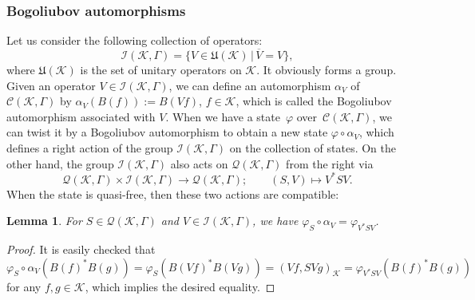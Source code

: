 \documentclass[pdftex]{sigma}
\numberwithin{equation}{section}
\newtheorem{Lemma}[Theorem]{Lemma}
\newcommand{\mfrak}[1]{\mathfrak{#1}}
\newcommand{\mcal}[1]{\mathcal{#1}}
\begin{document}
\subsubsection{Bogoliubov automorphisms}
Let us consider the following collection of operators:
\begin{equation*}
	\mcal{I}(\mcal{K},\Gamma)=\big\{V\in \mfrak{U}(\mcal{K})\,|\, \overline{V}=V\big\},
\end{equation*}
where $\mfrak{U}(\mcal{K})$ is the set of unitary operators on $\mcal{K}$. It obviously forms a group.
Given an operator $V\in \mcal{I}(\mcal{K},\Gamma)$, we can define an automorphism $\alpha_{V}$ of $\mcal{C}(\mcal{K},\Gamma)$ by $\alpha_{V}(B(f)):=B(Vf)$, $f\in \mcal{K}$, which is called the Bogoliubov automorphism associated with $V$.
When we have a state~$\varphi$ over~$\mcal{C}(\mcal{K},\Gamma)$, we can twist it by a Bogoliubov automorphism to obtain a new state $\varphi\circ \alpha_{V}$, which defines a right action of the group $\mcal{I}(\mcal{K},\Gamma)$ on the collection of states. On the other hand, the group $\mcal{I}(\mcal{K},\Gamma)$ also acts on $\mcal{Q}(\mcal{K},\Gamma)$ from the right via
\begin{equation*}
	\mcal{Q}(\mcal{K},\Gamma)\times \mcal{I}(\mcal{K},\Gamma)\to \mcal{Q}(\mcal{K},\Gamma);\qquad (S,V)\mapsto V^{\ast}SV.
\end{equation*}
When the state is quasi-free, then these two actions are compatible:
\begin{Lemma}
For $S\in \mcal{Q}(\mcal{K},\Gamma)$ and $V\in \mcal{I}(\mcal{K},\Gamma)$, we have $\varphi_{S}\circ \alpha_{V}=\varphi_{V^{\ast}SV}$.
\end{Lemma}
\begin{proof}
It is easily checked that
\begin{equation*}
	\varphi_{S}\circ \alpha_{V}(B(f)^{\ast}B(g))=\varphi_{S}(B(Vf)^{\ast}B(Vg))=(Vf,SVg)_{\mcal{K}}=\varphi_{V^{\ast}SV}(B(f)^{\ast}B(g))
\end{equation*}
for any $f,g\in\mcal{K}$, which implies the desired equality.
\end{proof}
\end{document}
